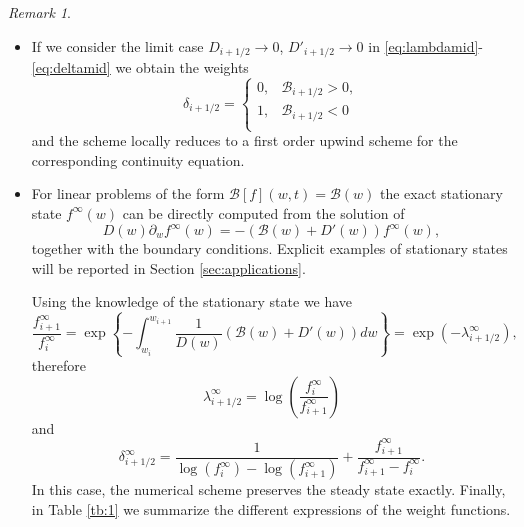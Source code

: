 \documentclass[a4paper]{article}
\theoremstyle{remark}\newtheorem{remark}{Remark}
\newcommand{\B}{\mathcal{B}}
\newcommand{\be}{\begin{equation}}
\newcommand{\ee}{\end{equation}}
\begin{document}
\begin{remark}\label{rem:grad}~
\begin{itemize}
\item 
If we consider the limit case $D_{i+1/2}\to 0$, $D'_{i+1/2}\to 0$ in \eqref{eq:lambdamid}-\eqref{eq:deltamid} we obtain the weights
\[
\delta_{i+1/2}=
\left\{
\begin{array}{cc}
 0, & \B_{i+1/2}>0,  \\
 1, & \B_{i+1/2}<0  \\
\end{array}
\right.
\]
and the scheme locally reduces to a first order upwind scheme for the corresponding continuity equation.
\item
For linear problems of the form $\B[f](w,t)=\B(w)$ the exact stationary state $f^{\infty}(w)$ can be directly computed from the solution of
\be\label{eq:FP_steady2}
D(w)\partial_w f^{\infty}(w) = -(\B(w)+D'(w))f^{\infty}(w),
\ee
together with the boundary conditions. Explicit examples of stationary states will be reported in Section \ref{sec:applications}.

Using the knowledge of the stationary state we have 
\be\label{eq:SS}
\dfrac{f^{\infty}_{i+1}}{f^{\infty}_i} = \exp \left\{ -\int_{w_i}^{w_{i+1}}\dfrac{1}{D(w)}(\B(w)+D'(w))dw  \right\}=\exp \left(-\lambda^{\infty}_{i+1/2} \right),
\ee 
therefore 
\be
\label{eq:lambda_inf}
\lambda^{\infty}_{i+1/2}=\log \left(\frac{f_{i}^{\infty}}{f_{i+1}^\infty}\right)\ee
and
\be\label{eq:delta_inf}
\delta^{\infty}_{i+1/2} = \dfrac{1}{\log(f_i^{\infty})-\log(f_{i+1}^{\infty})}+\dfrac{f_{i+1}^{\infty}}{f_{i+1}^{\infty}-f_{i}^{\infty}}. 
\ee
In this case, the numerical scheme preserves the steady state exactly. Finally, in Table \ref{tb:1} we summarize the different expressions of the weight functions. 

\end{itemize}
\end{remark}
\end{document}
